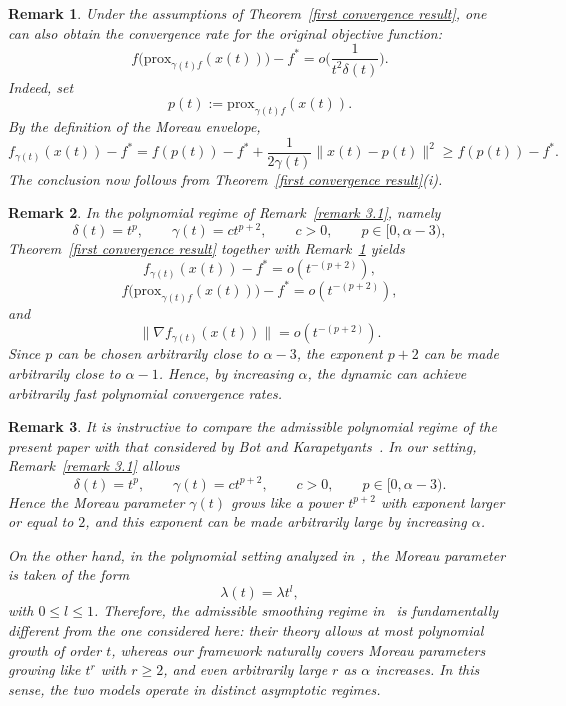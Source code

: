 \documentclass[11pt]{article}
\numberwithin{equation}{section}
\newtheorem{remark}{Remark}[section]
\begin{document}
\begin{remark}
\label{cor:prox-rate}
Under the assumptions of Theorem~\ref{first convergence result}, one can also obtain the convergence rate for the original objective function:
\[
f\Big(\text{prox}_{\gamma(t)f}(x(t))\Big)-f^*
=
o\Big(\frac{1}{t^2\delta(t)}\Big).
\]
Indeed, set
\[
p(t):=\text{prox}_{\gamma(t)f}(x(t)).
\]
By the definition of the Moreau envelope,
\[
f_{\gamma(t)}(x(t))-f^*
=
f(p(t))-f^*+\frac{1}{2\gamma(t)}\|x(t)-p(t)\|^2 \geq f(p(t))-f^*.
\]
The conclusion now follows from Theorem~\ref{first convergence result}(i).
\end{remark}
\begin{remark}
\label{rem:arbitrarily-fast}
In the polynomial regime of Remark~\ref{remark 3.1}, namely
\[
\delta(t)=t^p,\qquad \gamma(t)=ct^{p+2},
\qquad c>0,\qquad p\in[0,\alpha-3),
\]
Theorem~\ref{first convergence result} together with Remark~\ref{cor:prox-rate} yields
\[
f_{\gamma(t)}(x(t))-f^*
=o(t^{-(p+2)}),
\]
\[
f\bigl(\text{prox}_{\gamma(t)f}(x(t))\bigr)-f^*
=o(t^{-(p+2)}),
\]
and
\[
\|\nabla f_{\gamma(t)}(x(t))\|
=o(t^{-(p+2)}).
\]
Since \(p\) can be chosen arbitrarily close to \(\alpha-3\), the exponent \(p+2\) can be made arbitrarily close to \(\alpha-1\). Hence, by increasing \(\alpha\), the dynamic can achieve arbitrarily fast polynomial convergence rates.
\end{remark}
\begin{remark}
\label{rem:comparison-bot}
It is instructive to compare the admissible polynomial regime of the present paper with that considered by Bot and Karapetyants~\cite{BotKarapetyants2022}. In our setting, Remark~\ref{remark 3.1} allows
\[
\delta(t)=t^p,\qquad \gamma(t)=ct^{p+2},
\qquad c>0,\qquad p\in[0,\alpha-3).
\]
Hence the Moreau parameter \(\gamma(t)\) grows like a power \(t^{p+2}\) with exponent larger or equal to \(2\), and this exponent can be made arbitrarily large by increasing \(\alpha\).

On the other hand, in the polynomial setting analyzed in~\cite{BotKarapetyants2022}, the Moreau parameter is taken of the form
\[
\lambda(t)=\lambda t^l,
\]
with \(0\le l\le 1\). Therefore, the admissible smoothing regime in~\cite{BotKarapetyants2022} is fundamentally different from the one considered here: their theory allows at most polynomial growth of order \(t\), whereas our framework naturally covers Moreau parameters growing like \(t^r\) with \(r\geq2\), and even arbitrarily large \(r\) as \(\alpha\) increases. In this sense, the two models operate in distinct asymptotic regimes.
\end{remark}
\end{document}
